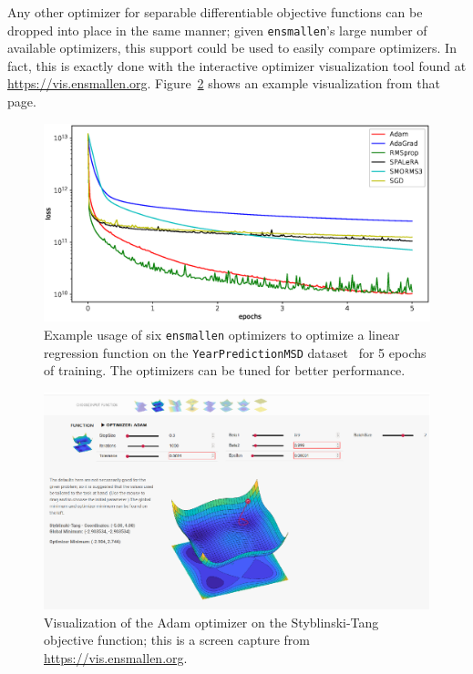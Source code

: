 Any other optimizer for separable differentiable objective
functions can be dropped into place in the same manner; given {\tt ensmallen}'s
large number of available optimizers, this support could be used to easily
compare optimizers.  In fact, this is exactly done with the interactive
optimizer visualization tool found at \url{https://vis.ensmallen.org}.
Figure~\ref{fig:visualization} shows an example visualization from that page.

\begin{figure}[t!]
  \vspace*{-1em}
  \centering
  \includegraphics[width=\textwidth,height=0.5\textwidth]{experiments/learning_curves_crop.eps}
  \vspace*{-2.5em}
\caption{
Example usage of six {\tt ensmallen} optimizers to optimize a linear regression
function on the {\tt YearPredictionMSD} dataset~\cite{ucimlrepository} for 5
epochs of training.  The optimizers can be tuned for better performance.}
\label{fig:learning_curve}
\end{figure}

\begin{figure}[t!]
  \centering
  \includegraphics[width=\textwidth]{experiments/visualization.eps}
  \vspace*{-2em}
  \caption{Visualization of the Adam optimizer on the Styblinski-Tang objective
function; this is a screen capture from \url{https://vis.ensmallen.org}.}
  \label{fig:visualization}
\end{figure}

